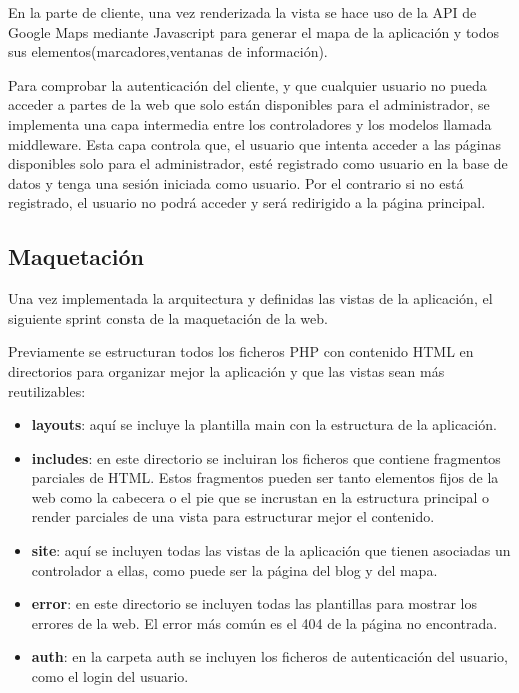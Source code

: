 En la parte de cliente, una vez renderizada la vista se hace uso de la API de Google Maps mediante Javascript para generar el mapa de la aplicación y todos sus elementos(marcadores,ventanas de información). 

\vspace{5 mm}

Para comprobar la autenticación del cliente, y que cualquier usuario no pueda acceder a partes de la web que solo están disponibles para el administrador, se implementa una capa intermedia entre los controladores y los modelos llamada middleware. Esta capa controla que, el usuario que intenta acceder a las páginas disponibles solo para el administrador, esté registrado como usuario en la base de datos y tenga una sesión iniciada como usuario. Por el contrario si no está registrado, el usuario no podrá acceder y será redirigido a la página principal.

\subsection{Maquetación}

Una vez implementada la arquitectura y definidas las vistas de la aplicación, el siguiente sprint consta de la maquetación de la web.

\vspace{5 mm}

Previamente se estructuran todos los ficheros PHP con contenido HTML en directorios para organizar mejor la aplicación y que las vistas sean más reutilizables:

\begin{itemize}

\item \textbf{layouts}: aquí se incluye la plantilla main con la estructura de la aplicación.

\item \textbf{includes}: en este directorio se incluiran los ficheros que contiene fragmentos parciales de HTML. Estos fragmentos pueden ser tanto elementos fijos de la web como la cabecera o el pie que se incrustan en la estructura principal o render parciales de una vista para estructurar mejor el contenido.

\item \textbf{site}: aquí se incluyen todas las vistas de la aplicación que tienen asociadas un controlador a ellas, como puede ser la página del blog y del mapa.

\item \textbf{error}: en este directorio se incluyen todas las plantillas para mostrar los errores de la web. El error más común es el 404 de la página no encontrada.

\item \textbf{auth}: en la carpeta auth se incluyen los ficheros de autenticación del usuario, como el login del usuario.

\end{itemize}

